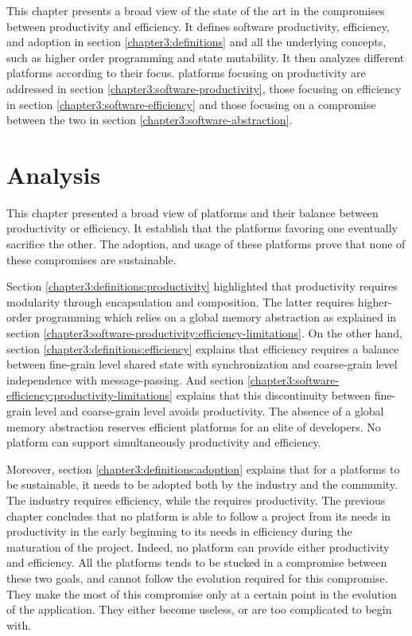 This chapter presents a broad view of the state of the art in the compromises between productivity and efficiency.
It defines software productivity, efficiency, and adoption in section \ref{chapter3:definitions} and all the underlying concepts, such as higher order programming and state mutability.
It then analyzes different platforms according to their focus. platforms focusing on productivity are addressed in section \ref{chapter3:software-productivity}, those focusing on efficiency in section \ref{chapter3:software-efficiency} and those focusing on a compromise between the two in section \ref{chapter3:software-abstraction}.









\section{Analysis}

This chapter presented a broad view of platforms and their balance between productivity or efficiency.
It establish that the platforms favoring one eventually sacrifice the other.
The adoption, and usage of these platforms prove that none of these compromises are sustainable.

Section \ref{chapter3:definitions:productivity} highlighted that productivity requires modularity through encapsulation and composition.
The latter requires higher-order programming which relies on a global memory abstraction as explained in section \ref{chapter3:software-productivity:efficiency-limitations}.
On the other hand, section \ref{chapter3:definitions:efficiency} explains that efficiency requires a balance between fine-grain level shared state with synchronization and coarse-grain level independence with message-passing.
And section \ref{chapter3:software-efficiency:productivity-limitations} explains that this discontinuity between fine-grain level and coarse-grain level avoids productivity.
The absence of a global memory abstraction reserves efficient platforms for an elite of developers.
No platform can support simultaneously productivity and efficiency.

Moreover, section \ref{chapter3:definitions:adoption} explains that for a platforms to be sustainable, it needs to be adopted both by the industry and the community.
The industry requires efficiency, while the requires productivity.
The previous chapter concludes that no platform is able to follow a project from its needs in productivity in the early beginning to its needs in efficiency during the maturation of the project.
Indeed, no platform can provide either productivity and efficiency.
All the platforms tends to be stucked in a compromise between these two goals, and cannot follow the evolution required for this compromise.
They make the most of this compromise only at a certain point in the evolution of the application.
They either become useless, or are too complicated to begin with.

